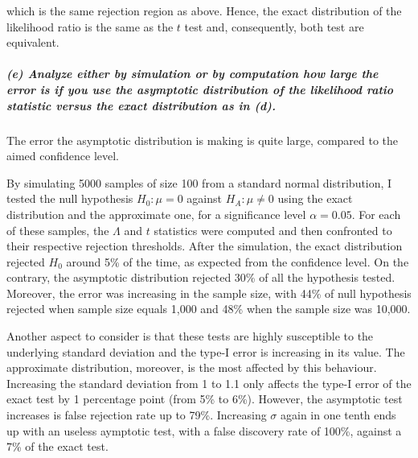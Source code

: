 \documentclass[11pt, english]{article}
\begin{document}
which is the same rejection region as above. Hence, the exact
distribution of the likelihood ratio is the same as the \(t\) test and,
consequently, both test are equivalent.

    \hypertarget{e-analyze-either-by-simulation-or-by-computation-how-large-the-error-is-if-you-use-the-asymptotic-distribution-of-the-likelihood-ratio-statistic-versus-the-exact-distribution-as-in-d.}{%
\subparagraph{(e) Analyze either by simulation or by computation how
large the error is if you use the asymptotic distribution of the
likelihood ratio statistic versus the exact distribution as in
(d).\\[2ex]}\label{e-analyze-either-by-simulation-or-by-computation-how-large-the-error-is-if-you-use-the-asymptotic-distribution-of-the-likelihood-ratio-statistic-versus-the-exact-distribution-as-in-d.}}

    The error the asymptotic distribution is making is quite large, compared
to the aimed confidence level.

By simulating 5000 samples of size 100 from a standard normal
distribution, I tested the null hypothesis \(H_0: \mu = 0\) against
\(H_A: \mu \neq 0\) using the exact distribution and the approximate
one, for a significance level \(\alpha = 0.05\). For each of these
samples, the \(\Lambda\) and \(t\) statistics were computed and then
confronted to their respective rejection thresholds. After the
simulation, the exact distribution rejected \(H_0\) around 5\% of the
time, as expected from the confidence level. On the contrary, the
asymptotic distribution rejected 30\% of all the hypothesis tested.
Moreover, the error was increasing in the sample size, with 44\% of null
hypothesis rejected when sample size equals 1,000 and 48\% when the
sample size was 10,000.

Another aspect to consider is that these tests are highly susceptible to
the underlying standard deviation and the type-I error is increasing in
its value. The approximate distribution, moreover, is the most affected
by this behaviour. Increasing the standard deviation from 1 to 1.1 only
affects the type-I error of the exact test by 1 percentage point (from
5\% to 6\%). However, the asymptotic test increases is false rejection
rate up to 79\%. Increasing \(\sigma\) again in one tenth ends up with
an useless aymptotic test, with a false discovery rate of 100\%, against
a 7\% of the exact test.

    
\end{document}
